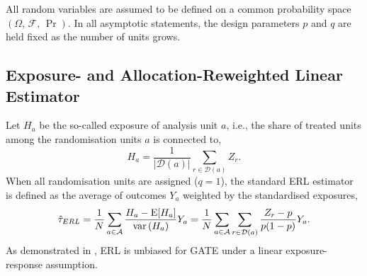 \documentclass[sigconf,anonymous,review]{acmart}
\newcounter{assumption}
\newcommand{\E}{\mathrm E}
\DeclareMathOperator{\var}{var}
\begin{document}
All random variables are assumed to be defined on a common probability space $(\Omega,\,\mathcal F,\,\Pr)$. In all asymptotic statements, the design parameters $p$ and $q$ are held fixed as the number of units grows.

\subsection{Exposure- and Allocation-Reweighted Linear Estimator}\label{subsec:estimator}

Let $H_a$ be the so-called exposure of analysis unit $a$, i.e., the share of treated units among the randomisation units $a$ is connected to,
\begin{equation}\label{eq:Ha}
    H_a = \frac{1}{|\mathcal{D}(a)|}\sum_{r\in\mathcal{D}(a)} Z_r.
\end{equation}
When all randomisation units are assigned ($q=1$), the standard ERL estimator \cite{harshaw2023erl} is defined as the average of outcomes $Y_a$ weighted by the standardised exposures,
\begin{equation}{\label{eq:erl}}
    \hat\tau_{ERL} = \frac 1 N \sum_{a\in\mathcal A} \frac{H_a - \E[H_a]}{\var \left(H_a\right)}Y_a =\frac{1}{N}\sum_{a\in\mathcal A}\sum_{r\in\mathcal{D}(a)}\frac{Z_r - p}{p(1-p)}Y_a.
\end{equation}
As demonstrated in \cite{harshaw2023erl}, ERL is unbiased for GATE under a linear exposure-response assumption.
\end{document}
